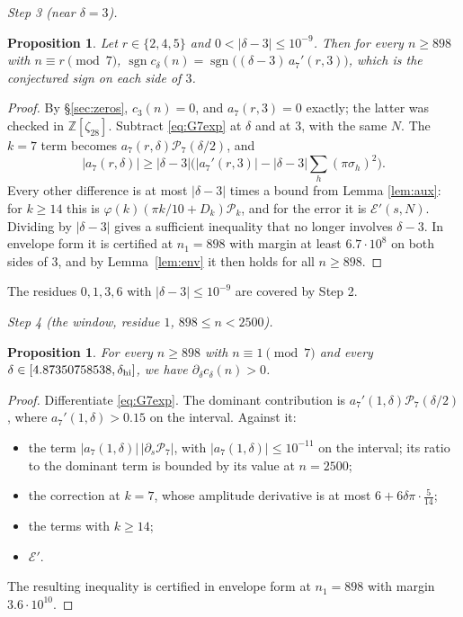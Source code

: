 \documentclass[11pt]{amsart}
\newtheorem{proposition}[theorem]{Proposition}
\theoremstyle{remark}
\theoremstyle{definition}
\newcommand{\Z}{\mathbb Z}
\newcommand{\cP}{\mathcal P}
\newcommand{\cE}{\mathcal E}
\newcommand{\sgn}{\operatorname{sgn}}
\begin{document}
\emph{Step 3 (near $\delta=3$).}
\begin{proposition}\label{prop:eps3}
Let $r\in\{2,4,5\}$ and $0<|\delta-3|\le10^{-9}$. Then for every $n\ge898$ with $n\equiv r\pmod 7$, $\sgn c_\delta(n)=\sgn\big((\delta-3)\,a_7'(r,3)\big)$, which is the conjectured sign on each side of $3$.
\end{proposition}
\begin{proof}
By \S\ref{sec:zeros}, $c_3(n)=0$, and $a_7(r,3)=0$ exactly; the latter was checked in $\Z[\zeta_{28}]$. Subtract \eqref{eq:G7exp} at $\delta$ and at $3$, with the same $N$. The $k=7$ term becomes $a_7(r,\delta)\cP_7(\delta/2)$, and
\[
|a_7(r,\delta)|\ge|\delta-3|\Big(|a_7'(r,3)|-|\delta-3|\sum_h(\pi\sigma_h)^2\Big).
\]
Every other difference is at most $|\delta-3|$ times a bound from Lemma \ref{lem:aux}: for $k\ge14$ this is $\varphi(k)(\pi k/10+D_k)\cP_k$, and for the error it is $\cE'(s,N)$. Dividing by $|\delta-3|$ gives a sufficient inequality that no longer involves $\delta-3$. In envelope form it is certified at $n_1=898$ with margin at least $6.7\cdot10^8$ on both sides of $3$, and by Lemma~\ref{lem:env} it then holds for all $n\ge898$.
\end{proof}
The residues $0,1,3,6$ with $|\delta-3|\le10^{-9}$ are covered by Step 2.

\emph{Step 4 (the window, residue $1$, $898\le n<2500$).}
\begin{proposition}\label{prop:window}
For every $n\ge898$ with $n\equiv1\pmod7$ and every $\delta\in[4.87350758538,\delta_{\rm hi}]$, we have $\partial_\delta c_\delta(n)>0$.
\end{proposition}
\begin{proof}
Differentiate \eqref{eq:G7exp}. The dominant contribution is $a_7'(1,\delta)\cP_7(\delta/2)$, where $a_7'(1,\delta)>0.15$ on the interval. Against it:
\begin{itemize}[leftmargin=2em]
\item the term $|a_7(1,\delta)|\,|\partial_s\cP_7|$, with $|a_7(1,\delta)|\le10^{-11}$ on the interval; its ratio to the dominant term is bounded by its value at $n=2500$;
\item the correction at $k=7$, whose amplitude derivative is at most $6+6\delta\pi\cdot\frac5{14}$;
\item the terms with $k\ge14$;
\item $\cE'$.
\end{itemize}
The resulting inequality is certified in envelope form at $n_1=898$ with margin $3.6\cdot10^{10}$.
\end{proof}
\end{document}
